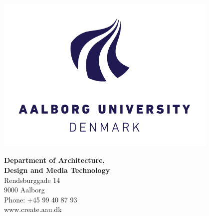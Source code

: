 

\thispagestyle{empty}

\begin{minipage}{0.55\textwidth}
	\includegraphics[width=0.8\textwidth]{AAU_LOGO_RGB_UK.png}
\end{minipage}
\begin{minipage}{0.35\textwidth}
{ \textbf{\small Department of Architecture,}}\\
{ \textbf{\small Design and Media Technology}}\\
{\small  Rendsburggade 14} \\
{\small 9000 Aalborg} \\
{\small Phone: +45 99 40 87 93} \\
{\small  www.create.aau.dk}
\end{minipage}

\vspace*{1cm}


